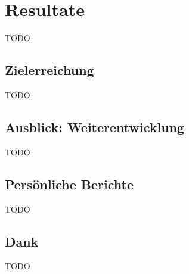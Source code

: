 \section{Resultate}
\label{sec:Resultate}
TODO

\subsection{Zielerreichung}
\label{sub:Zielerreichung}
TODO

\subsection{Ausblick: Weiterentwicklung}
\label{sub:Ausblick: Weiterentwicklung}
TODO

\subsection{Persönliche Berichte}
\label{sub:Persönliche Berichte}
TODO

\subsection{Dank}
\label{sub:Dank}
TODO
